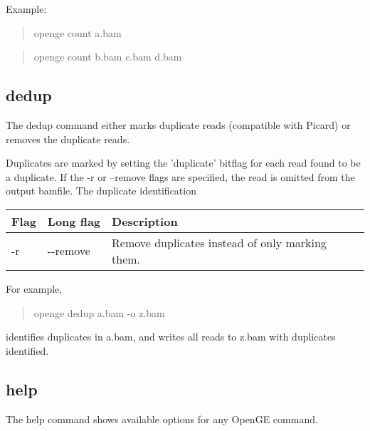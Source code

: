 \documentclass[11pt]{article}
\newcommand {\cmd}[1] {\begin{quote}#1\end{quote}}
\begin{document}
Example:
\cmd{openge count a.bam}
\cmd{openge count b.bam c.bam d.bam}

\subsection {dedup}
The dedup command either marks duplicate reads (compatible with Picard) or removes the duplicate reads. 

Duplicates are marked by setting the 'duplicate' bitflag for each read found to be a duplicate. If the -r or --remove flags are specified, the read is omitted from the output bamfile. The duplicate identification 

\begin{center}
\begin{tabular}{llp{3.5in}}
\hline
Flag&Long flag&Description\\ \hline
-r&{-}{-}remove&Remove duplicates instead of only marking them.\\
\end{tabular}
\end{center}

For example,
\cmd{openge dedup a.bam -o z.bam} 
identifies duplicates in a.bam, and writes all reads to z.bam with duplicates identified.

\begin{comment}
\subsection {head}
A single bamfile is generated from the first \textit{n} reads in the provided file. The header information saved is the same as in the input file.

For example,
\cmd{openge head -o output.bam infile.bam -n 500}
generates a BAM file called output.bam that contains the header and the first 500 reads contained in infile.bam.

Parameters:
\begin{center}
\begin{tabular}{llp{3.5in}}
\hline
Flag&Long flag&Description\\ \hline
-n \textit{number}&{-}{-}count \textit{number}&Number of reads to include in the generated file\\
\end{tabular}
\end{center}
\end{comment}

\subsection {help}
The help command shows available options for any OpenGE command. 
\end{document}
